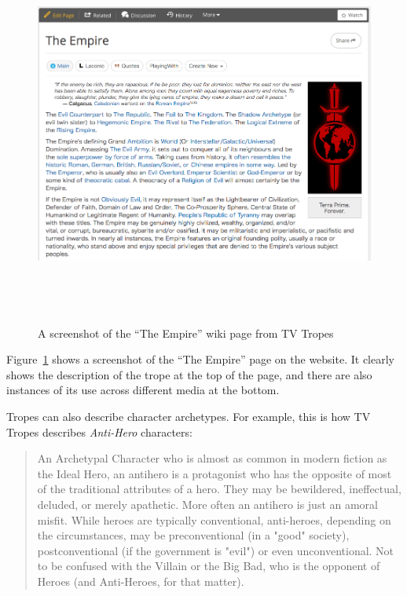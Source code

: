\documentclass[11pt]{report}
\begin{document}
\begin{figure}[!t]
\centerline{\includegraphics[height=5in]{evilEmpire.png}}
\caption{A screenshot of the ``The Empire'' wiki page from TV Tropes} \label{fig:evil-empire}
\end{figure}

Figure~\ref{fig:evil-empire} shows a screenshot of the ``The Empire'' page on the
website. It clearly shows the description of the trope at the top of the page,
and there are also instances of its use across different media at the bottom.

Tropes can also describe character archetypes. For example, this is how TV
Tropes describes \emph{Anti-Hero} characters:

\begin{quote}
An Archetypal Character who is almost as common in modern fiction as the Ideal Hero, an antihero is a protagonist who has the opposite of most of the traditional attributes of a hero. They may be bewildered, ineffectual, deluded, or merely apathetic. More often an antihero is just an amoral misfit. While heroes are typically conventional, anti-heroes, depending on the circumstances, may be preconventional (in a "good" society), postconventional (if the government is "evil") or even unconventional. Not to be confused with the Villain or the Big Bad, who is the opponent of Heroes (and Anti-Heroes, for that matter).
  \end{quote}
\end{document}
